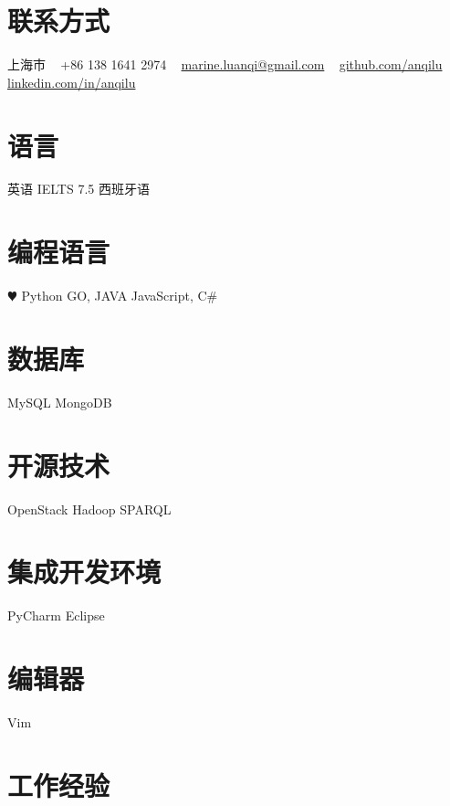 \documentclass[]{friggeri-cv-cn} %
\begin{document}


\begin{aside} %
\section{联系方式}
上海市
~
+86 138 1641 2974
~
\href{mailto:marine.luanqi@gmail.com}{marine.luanqi@gmail.com}
~
\href{https://github.com/anqilu}{github.com/anqilu}
\href{https://www.linkedin.com/in/anqilu}{linkedin.com/in/anqilu}
\section{语言}
英语 IELTS 7.5
西班牙语
\section{编程语言}
{\color{red} $\varheartsuit$} Python
GO, JAVA
JavaScript, C\#
\section{数据库}
MySQL
MongoDB
\section{开源技术}
OpenStack
Hadoop
SPARQL
\section{集成开发环境}
PyCharm
Eclipse
\section{编辑器}
Vim
\end{aside}


\section{工作经验}
\end{document}
